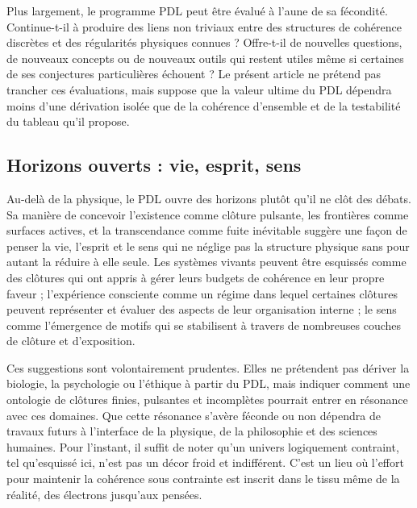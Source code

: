 \documentclass[11pt,a4paper]{article}
\theoremstyle{definition}
\begin{document}
Plus largement, le programme PDL peut être évalué à l’aune de sa fécondité. Continue-t-il à produire des liens non triviaux entre des structures de cohérence discrètes et des régularités physiques connues ? Offre-t-il de nouvelles questions, de nouveaux concepts ou de nouveaux outils qui restent utiles même si certaines de ses conjectures particulières échouent ?\cite{Laubscher_PDL_GlobalMapping_v6_2024,Laubscher_CavityModes_PDL_2024} Le présent article ne prétend pas trancher ces évaluations, mais suppose que la valeur ultime du PDL dépendra moins d’une dérivation isolée que de la cohérence d’ensemble et de la testabilité du tableau qu’il propose.

\subsection{Horizons ouverts : vie, esprit, sens}

Au-delà de la physique, le PDL ouvre des horizons plutôt qu’il ne clôt des débats. Sa manière de concevoir l’existence comme clôture pulsante, les frontières comme surfaces actives, et la transcendance comme fuite inévitable suggère une façon de penser la vie, l’esprit et le sens qui ne néglige pas la structure physique sans pour autant la réduire à elle seule.\cite{Laubscher_Existence_PulsatingClosure_2026,Laubscher_PDL_TO_Dialogue_2024} Les systèmes vivants peuvent être esquissés comme des clôtures qui ont appris à gérer leurs budgets de cohérence en leur propre faveur ; l’expérience consciente comme un régime dans lequel certaines clôtures peuvent représenter et évaluer des aspects de leur organisation interne ; le sens comme l’émergence de motifs qui se stabilisent à travers de nombreuses couches de clôture et d’exposition.

Ces suggestions sont volontairement prudentes. Elles ne prétendent pas dériver la biologie, la psychologie ou l’éthique à partir du PDL, mais indiquer comment une ontologie de clôtures finies, pulsantes et incomplètes pourrait entrer en résonance avec ces domaines.\cite{Laubscher_Existence_PulsatingClosure_2026} Que cette résonance s’avère féconde ou non dépendra de travaux futurs à l’interface de la physique, de la philosophie et des sciences humaines. Pour l’instant, il suffit de noter qu’un univers logiquement contraint, tel qu’esquissé ici, n’est pas un décor froid et indifférent. C’est un lieu où l’effort pour maintenir la cohérence sous contrainte est inscrit dans le tissu même de la réalité, des électrons jusqu’aux pensées.
\end{document}
